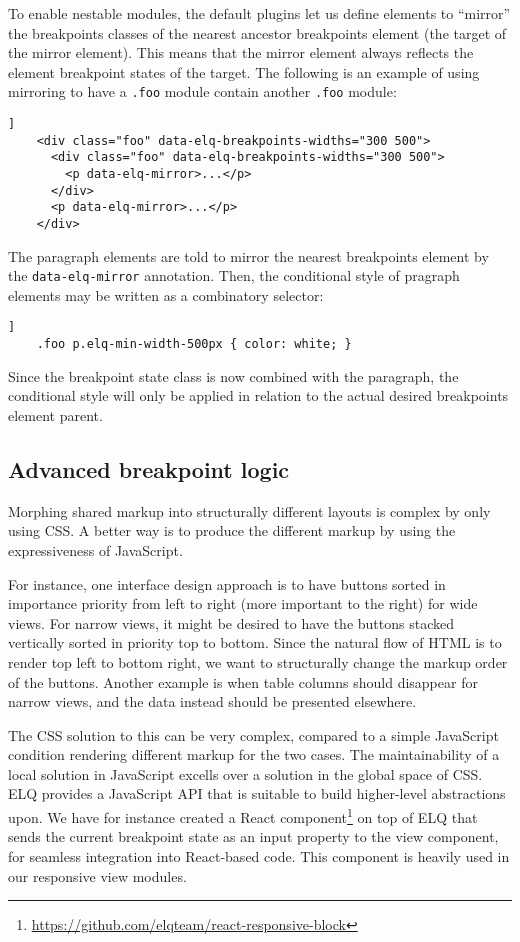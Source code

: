 \documentclass[sigconf,9pt]{acmart}
\newcommand{\elq}{ELQ}
\newcommand{\code}[1]{\texttt{#1}}
\begin{document}
  To enable nestable modules, the default plugins let us define elements to ``mirror'' the breakpoints classes of the nearest ancestor breakpoints element (the target of the mirror element).
  This means that the mirror element always reflects the element breakpoint states of the target.
  The following is an example of using mirroring to have a \code{.foo} module contain another \code{.foo} module:
  \begin{lstlisting}[gobble=4,caption={},captionpos=b,label={}]]
    <div class="foo" data-elq-breakpoints-widths="300 500">
      <div class="foo" data-elq-breakpoints-widths="300 500">
        <p data-elq-mirror>...</p>
      </div>
      <p data-elq-mirror>...</p>
    </div>
  \end{lstlisting}
  The paragraph elements are told to mirror the nearest breakpoints element by the \code{data-elq-mirror} annotation.
  Then, the conditional style of pragraph elements may be written as a combinatory selector:
  \begin{lstlisting}[gobble=4,caption={},captionpos=b,label={code:elq-mirror-example-css}]]
    .foo p.elq-min-width-500px { color: white; }
  \end{lstlisting}
  Since the breakpoint state class is now combined with the paragraph, the conditional style will only be applied in relation to the actual desired breakpoints element parent.

  \subsection{Advanced breakpoint logic}
    Morphing shared markup into structurally different layouts is complex by only using CSS.
    A better way is to produce the different markup by using the expressiveness of JavaScript.

    For instance, one interface design approach is to have buttons sorted in importance priority from left to right (more important to the right) for wide views.
    For narrow views, it might be desired to have the buttons stacked vertically sorted in priority top to bottom.
    Since the natural flow of HTML is to render top left to bottom right, we want to structurally change the markup order of the buttons.
    Another example is when table columns should disappear for narrow views, and the data instead should be presented elsewhere.

    The CSS solution to this can be very complex, compared to a simple JavaScript condition rendering different markup for the two cases.
    The maintainability of a local solution in JavaScript excells over a solution in the global space of CSS.
    \elq{} provides a JavaScript API that is suitable to build higher-level abstractions upon.
    We have for instance created a React component\footnote{\url{https://github.com/elqteam/react-responsive-block}} on top of \elq{} that sends the current breakpoint state as an input property to the view component, for seamless integration into React-based code. This component is heavily used in our responsive view modules.
\end{document}
